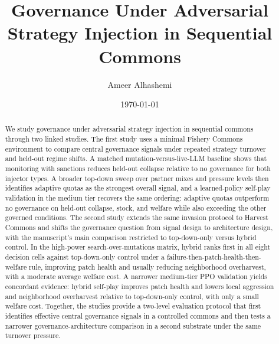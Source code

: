 \documentclass[10pt]{article}
\title{Governance Under Adversarial Strategy Injection in Sequential Commons}
\author{Ameer Alhashemi}
\date{\today}
\begin{document}
\maketitle

\begin{abstract}
We study governance under adversarial strategy injection in sequential commons through two linked studies. The first study uses a minimal Fishery Commons environment to compare central governance signals under repeated strategy turnover and held-out regime shifts. A matched mutation-versus-live-LLM baseline shows that monitoring with sanctions reduces held-out collapse relative to no governance for both injector types. A broader top-down sweep over partner mixes and pressure levels then identifies adaptive quotas as the strongest overall signal, and a learned-policy self-play validation in the medium tier recovers the same ordering: adaptive quotas outperform no governance on held-out collapse, stock, and welfare while also exceeding the other governed conditions. The second study extends the same invasion protocol to Harvest Commons and shifts the governance question from signal design to architecture design, with the manuscript's main comparison restricted to top-down-only versus hybrid control. In the high-power search-over-mutations matrix, hybrid ranks first in all eight decision cells against top-down-only control under a failure-then-patch-health-then-welfare rule, improving patch health and usually reducing neighborhood overharvest, with a moderate average welfare cost. A narrower medium-tier PPO validation yields concordant evidence: hybrid self-play improves patch health and lowers local aggression and neighborhood overharvest relative to top-down-only control, with only a small welfare cost. Together, the studies provide a two-level evaluation protocol that first identifies effective central governance signals in a controlled commons and then tests a narrower governance-architecture comparison in a second substrate under the same turnover pressure.
\end{abstract}







{\small


}
\end{document}
